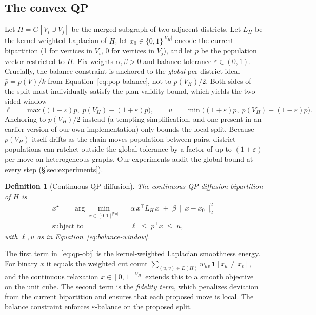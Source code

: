 \documentclass[11pt]{article}
\newtheorem{definition}{Definition}[section]
\begin{document}
\subsection{The convex QP}\label{sec:qp-model}

Let $H = G[V_i \cup V_j]$ be the merged subgraph of two adjacent
districts. Let $L_H$ be the kernel-weighted Laplacian of $H$, let
$x_0 \in \{0,1\}^{|V_H|}$ encode the current bipartition (1 for
vertices in $V_i$, 0 for vertices in $V_j$), and let $p$ be the
population vector restricted to $H$. Fix weights $\alpha, \beta > 0$
and balance tolerance $\varepsilon \in (0, 1)$. Crucially, the balance
constraint is anchored to the \emph{global} per-district ideal
$\bar p = p(V)/k$ from Equation~\eqref{eq:pop-balance}, not to
$p(V_H)/2$. Both sides of the split must individually satisfy the
plan-validity bound, which yields the two-sided window
\begin{equation}\label{eq:balance-window}
  \ell \;=\; \max\bigl((1-\varepsilon)\bar p,\; p(V_H) - (1+\varepsilon)\bar p\bigr),
  \qquad
  u \;=\; \min\bigl((1+\varepsilon)\bar p,\; p(V_H) - (1-\varepsilon)\bar p\bigr).
\end{equation}
Anchoring to $p(V_H)/2$ instead (a tempting simplification, and one
present in an earlier version of our own implementation) only bounds
the local split. Because $p(V_H)$ itself drifts as the chain moves
population between pairs, district populations can ratchet outside the
global tolerance by a factor of up to $(1+\varepsilon)$ per move on
heterogeneous graphs. Our experiments audit the global bound at every
step (\S\ref{sec:experiments}).

\begin{definition}[Continuous QP-diffusion]\label{def:qp}
The continuous QP-diffusion bipartition of $H$ is
\begin{align}
  x^\star \;=\; \arg\min_{x \in [0,1]^{|V_H|}} \;\;
    & \alpha\, x^\top L_H\, x \;+\; \beta\, \|x - x_0\|_2^2 \label{eq:qp-obj} \\
  \text{subject to} \;\;
    & \ell \;\le\; p^\top x \;\le\; u,
    \label{eq:qp-balance}
\end{align}
with $\ell, u$ as in Equation~\eqref{eq:balance-window}.
\end{definition}

The first term in~\eqref{eq:qp-obj} is the kernel-weighted Laplacian
smoothness energy. For binary $x$ it equals the weighted cut count
$\sum_{(u,v) \in E(H)} w_{uv}\,\mathbf{1}[x_u \ne x_v]$, and the
continuous relaxation $x \in [0,1]^{|V_H|}$ extends this to a smooth
objective on the unit cube. The second term is the \emph{fidelity term},
which penalizes deviation from the current bipartition and ensures
that each proposed move is local. The balance constraint enforces
$\varepsilon$-balance on the proposed split.
\end{document}
